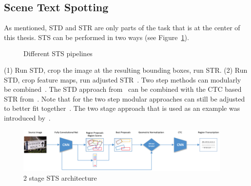 \subsection{Scene Text Spotting}
As mentioned, \ac{STD} and \ac{STR} are only parts of the task that is at the center of this thesis.
\ac{STS} can be performed in two ways (see Figure~\ref{fig:e2e-pipelines}).

\begin{figure}[ht]
    \centering
    
    \caption{Different STS pipelines\label{fig:e2e-pipelines}}
\end{figure}
(1) Run \ac{STD}, crop the image at the resulting bounding boxes, run \ac{STR}.
(2) Run \ac{STD}, crop feature maps, run adjusted \ac{STR}~\citep{chen_text_2021,long_scene_2021}.
Two step methods can modularly be combined~\citep{liao_textboxes_2017,shi_aster_2019}.
The \ac{STD} approach from~\cite{liao_textboxes_2017} can be combined with the CTC based \ac{STR}
from~\cite{shi_end--end_2017}.
Note that for the two step modular approaches can still be adjusted to better fit
together~\citep{liao_textboxes_2017}.
The two stage approach that is used as an example was introduced by~\cite{busta_deep_2017}.
\begin{figure}[h]
    \centering
    \includegraphics[width=0.95\textwidth]{img/E2E-two-stage-architecture-Bust-Deep-2017.png}
    \caption[2 stage STS architecture]{%
        2 stage STS architecture~\citep{busta_deep_2017}\label{fig:e2e-2-stage}
    }
\end{figure}

